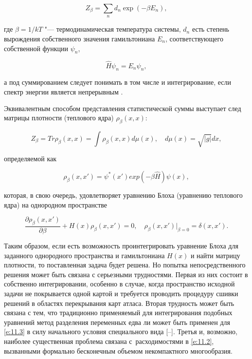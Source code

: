 \begin{equation}\label{e:11.1}

Z_{\beta}=\sum\limits_{n} d_n \exp(-\beta E_n),

\end{equation}

где $\beta=1/kT$ "--- термодинамическая температура системы, $d_n$ есть степень вырождения собственного значения гамильтониана $E_n$, соответствующего собственной функции $\psi_n$,

$$

\hat H \psi_n=E_n\psi_n,

$$

а под суммированием следует понимать в том числе и интегрирование, если спектр энергии является непрерывным \cite{mikh:bib:Hrt}.

Эквивалентным способом представления статистической суммы выступает след матрицы плотности (теплового ядра) $\rho_{\beta}(x,x)$:

\begin{equation}\label{e:11.2}

Z_{\beta}=Tr\rho_{\beta}(x,x)= \int \rho_{\beta}(x,x) d\mu(x),\quad d\mu(x)=\sqrt{|g|}dx,

\end{equation}

определяемой как

$$

\rho_{\beta}(x,x')=\psi^{*}(x')exp(-\beta \hat H)\psi(x),

$$

которая, в свою очередь, удовлетворяет уравнению Блоха (уравнению теплового ядра) на однородном пространстве

\begin{equation}\label{e:11.3}

\frac{\partial \rho_{\beta}(x,x')}{\partial \beta}+H(x) \rho_{\beta}(x,x') =

0, \quad \rho_{\beta}(x,x')|_{\beta=0}=\delta(x,x').

\end{equation}



Таким образом, если есть возможность проинтегрировать уравнение Блоха для заданного однородного пространства и гамильтониана $H(x)$ и найти матрицу плотности, то поставленная задача будет решена. Но попытка непосредственного решения может быть связана с серьезными трудностями. Первая из них состоит в собственно интегрировании, особенно в случае, когда пространство исходной задачи не покрывается одной картой и требуется проводить процедуру сшивки решений в областях перекрывания карт атласа. Вторая трудность может быть связана с тем, что традиционно применяемый для интегрирования подобных уравнений метод разделения переменных едва ли может быть применен для \eqref{e:11.3} в силу начального условия специального вида [--]. Третья и, возможно, наиболее существенная проблема связана с~расходимостями в  \eqref{e:11.2}, вызванными формально бесконечным объемом некомпактного многообразия. 

